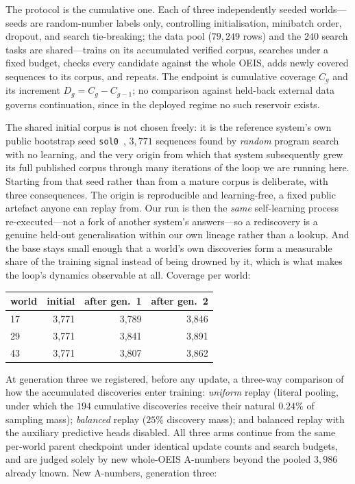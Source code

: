 \documentclass[11pt]{article}
\newcommand{\code}[1]{\texttt{#1}}
\begin{document}
The protocol is the cumulative one. Each of three independently seeded worlds---seeds are
random-number labels only, controlling initialisation, minibatch order, dropout, and search
tie-breaking; the data pool ($79{,}249$ rows) and the $240$ search tasks are shared---trains
on its accumulated verified corpus, searches under a fixed budget, checks every candidate
against the whole OEIS, adds newly covered sequences to its corpus, and repeats. The
endpoint is cumulative coverage $C_g$ and its increment $D_g = C_g - C_{g-1}$; no
comparison against held-back external data governs continuation, since in the deployed
regime no such reservoir exists.

The shared initial corpus is not chosen freely: it is the reference system's own public
bootstrap seed \code{sol0}~\cite{gauthier2023}, $3{,}771$ sequences found by \emph{random}
program search with no learning, and the very origin from which that system subsequently
grew its full published corpus through many iterations of the loop we are running here.
Starting from that seed rather than from a mature corpus is deliberate, with three
consequences. The origin is reproducible and learning-free, a fixed public artefact anyone
can replay from. Our run is then the \emph{same} self-learning process re-executed---not a
fork of another system's answers---so a rediscovery is a genuine held-out generalisation
within our own lineage rather than a lookup. And the base stays small enough that a world's
own discoveries form a measurable share of the training signal instead of being drowned by
it, which is what makes the loop's dynamics observable at all. Coverage per world:

\begin{center}
\begin{tabular}{lrrr}
\toprule
world & initial & after gen.\ 1 & after gen.\ 2 \\
\midrule
17 & 3{,}771 & 3{,}789 & 3{,}846 \\
29 & 3{,}771 & 3{,}841 & 3{,}891 \\
43 & 3{,}771 & 3{,}807 & 3{,}862 \\
\bottomrule
\end{tabular}
\end{center}

At generation three we registered, before any update, a three-way comparison of how the
accumulated discoveries enter training: \emph{uniform} replay (literal pooling, under which
the $194$ cumulative discoveries receive their natural $0.24\%$ of sampling mass);
\emph{balanced} replay ($25\%$ discovery mass); and balanced replay with the auxiliary
predictive heads disabled. All three arms continue from the same per-world parent
checkpoint under identical update counts and search budgets, and are judged solely by new
whole-OEIS A-numbers beyond the pooled $3{,}986$ already known. New A-numbers, generation
three:
\end{document}

